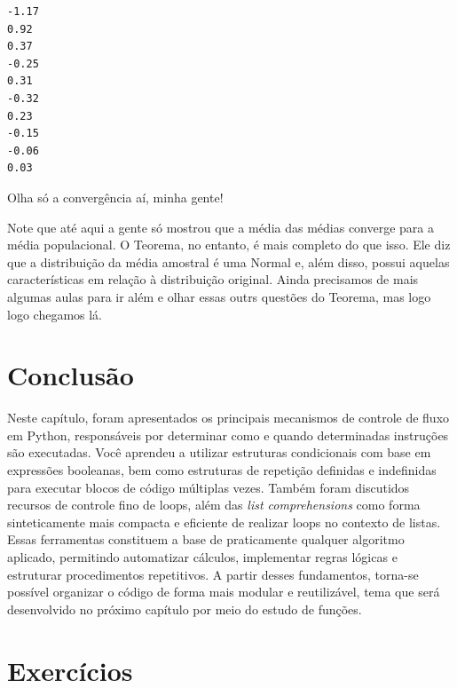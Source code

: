 \documentclass[
  brazilian,
  letterpaper,
  DIV=11,
  numbers=noendperiod]{scrreprt}
\begin{document}
\begin{verbatim}
-1.17
0.92
0.37
-0.25
0.31
-0.32
0.23
-0.15
-0.06
0.03
\end{verbatim}

Olha só a convergência aí, minha gente!

Note que até aqui a gente só mostrou que a média das médias converge
para a média populacional. O Teorema, no entanto, é mais completo do que
isso. Ele diz que a distribuição da média amostral é uma Normal e, além
disso, possui aquelas características em relação à distribuição
original. Ainda precisamos de mais algumas aulas para ir além e olhar
essas outrs questões do Teorema, mas logo logo chegamos lá.

\section{Conclusão}\label{conclusuxe3o-4}

Neste capítulo, foram apresentados os principais mecanismos de controle
de fluxo em Python, responsáveis por determinar como e quando
determinadas instruções são executadas. Você aprendeu a utilizar
estruturas condicionais com base em expressões booleanas, bem como
estruturas de repetição definidas e indefinidas para executar blocos de
código múltiplas vezes. Também foram discutidos recursos de controle
fino de loops, além das \emph{list comprehensions} como forma
sinteticamente mais compacta e eficiente de realizar loops no contexto
de listas. Essas ferramentas constituem a base de praticamente qualquer
algoritmo aplicado, permitindo automatizar cálculos, implementar regras
lógicas e estruturar procedimentos repetitivos. A partir desses
fundamentos, torna-se possível organizar o código de forma mais modular
e reutilizável, tema que será desenvolvido no próximo capítulo por meio
do estudo de funções.

\section{Exercícios}\label{exercuxedcios-4}
\end{document}
